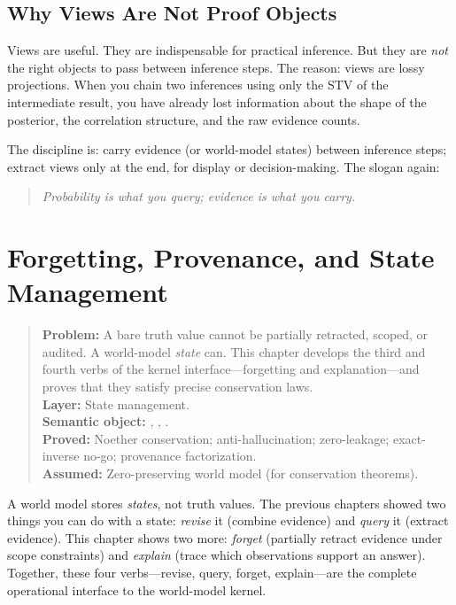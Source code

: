 \documentclass[11pt,openany]{report}
\begin{document}
\section{Why Views Are Not Proof Objects}
\label{sec:views-not-proof}

Views are useful.  They are indispensable for practical inference.  But
they are \emph{not} the right objects to pass between inference steps.
The reason: views are lossy projections.  When you chain two inferences
using only the STV of the intermediate result, you have already lost
information about the shape of the posterior, the correlation structure,
and the raw evidence counts.

The \xiPLN{} discipline is: carry evidence (or world-model states)
between inference steps; extract views only at the end, for display
or decision-making.  The slogan again:

\begin{quote}
\emph{Probability is what you query; evidence is what you carry.}
\end{quote}


\chapter{Forgetting, Provenance, and State Management}
\label{ch:forgetting-provenance}

\begin{quote}\small
\textbf{Problem:} A bare truth value cannot be partially retracted,
scoped, or audited.  A world-model \emph{state} can.  This chapter
develops the third and fourth verbs of the kernel interface---forgetting
and explanation---and proves that they satisfy precise conservation laws.\\[4pt]
\textbf{Layer:} State management.\\
\textbf{Semantic object:} , , .\\
\textbf{Proved:} Noether conservation; anti-hallucination; zero-leakage; exact-inverse no-go; provenance factorization.\\
\textbf{Assumed:} Zero-preserving world model (for conservation theorems).
\end{quote}

A world model stores \emph{states}, not truth values.  The previous
chapters showed two things you can do with a state: \emph{revise} it
(combine evidence) and \emph{query} it (extract evidence).  This chapter
shows two more: \emph{forget} (partially retract evidence under scope
constraints) and \emph{explain} (trace which observations support an
answer).  Together, these four verbs---revise, query, forget,
explain---are the complete operational interface to the world-model
kernel.
\end{document}
